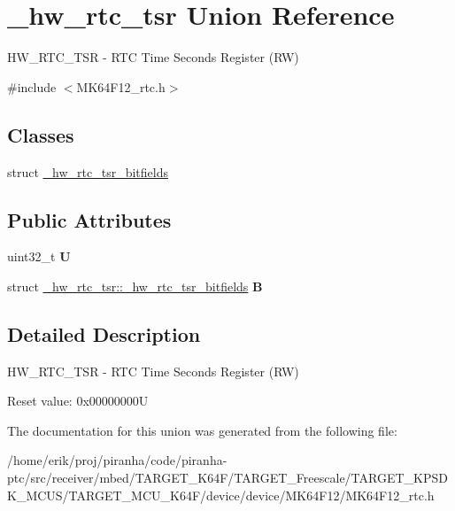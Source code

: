 \hypertarget{union__hw__rtc__tsr}{}\section{\+\_\+hw\+\_\+rtc\+\_\+tsr Union Reference}
\label{union__hw__rtc__tsr}


H\+W\+\_\+\+R\+T\+C\+\_\+\+T\+SR -\/ R\+TC Time Seconds Register (RW)  




{\ttfamily \#include $<$M\+K64\+F12\+\_\+rtc.\+h$>$}

\subsection*{Classes}
\begin{DoxyCompactItemize}
\item 
struct \hyperlink{struct__hw__rtc__tsr_1_1__hw__rtc__tsr__bitfields}{\+\_\+hw\+\_\+rtc\+\_\+tsr\+\_\+bitfields}
\end{DoxyCompactItemize}
\subsection*{Public Attributes}
\begin{DoxyCompactItemize}
\item 
uint32\+\_\+t {\bfseries U}\hypertarget{union__hw__rtc__tsr_af12cdf08b26196c8c6897af9b299751b}{}\label{union__hw__rtc__tsr_af12cdf08b26196c8c6897af9b299751b}

\item 
struct \hyperlink{struct__hw__rtc__tsr_1_1__hw__rtc__tsr__bitfields}{\+\_\+hw\+\_\+rtc\+\_\+tsr\+::\+\_\+hw\+\_\+rtc\+\_\+tsr\+\_\+bitfields} {\bfseries B}\hypertarget{union__hw__rtc__tsr_a9aacd338cd4bbfb7c041d952b1f042ab}{}\label{union__hw__rtc__tsr_a9aacd338cd4bbfb7c041d952b1f042ab}

\end{DoxyCompactItemize}


\subsection{Detailed Description}
H\+W\+\_\+\+R\+T\+C\+\_\+\+T\+SR -\/ R\+TC Time Seconds Register (RW) 

Reset value\+: 0x00000000U 

The documentation for this union was generated from the following file\+:\begin{DoxyCompactItemize}
\item 
/home/erik/proj/piranha/code/piranha-\/ptc/src/receiver/mbed/\+T\+A\+R\+G\+E\+T\+\_\+\+K64\+F/\+T\+A\+R\+G\+E\+T\+\_\+\+Freescale/\+T\+A\+R\+G\+E\+T\+\_\+\+K\+P\+S\+D\+K\+\_\+\+M\+C\+U\+S/\+T\+A\+R\+G\+E\+T\+\_\+\+M\+C\+U\+\_\+\+K64\+F/device/device/\+M\+K64\+F12/M\+K64\+F12\+\_\+rtc.\+h\end{DoxyCompactItemize}
